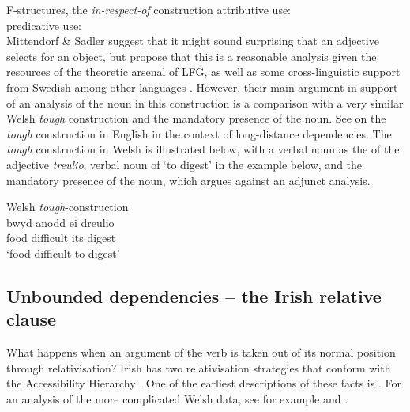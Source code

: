 \documentclass[output=paper,colorlinks,citecolor=brown]{langscibook}
\begin{document}
\ea\label{ex:Celtic:23} F-structures, the \emph{in-respect-of} construction \citep[12]{MittSadl08}
\ea attributive use:\\[1ex]
{}
\ex predicative use:\\[1ex]
{}
\z\z
Mittendorf \& Sadler suggest that it might sound surprising that an adjective selects for an object, but propose that this is a reasonable analysis given the resources of the theoretic arsenal of LFG, as well as some cross-linguistic support from Swedish among other languages \citep[18]{MittSadl08}. However, their main argument in support of an \OBJ analysis of the noun in this construction is a comparison with a very similar Welsh \emph{tough} construction and the mandatory presence of the noun.  See  on the \emph{tough} construction in English in the context of long-distance dependencies.  The \emph{tough} construction in Welsh is illustrated below, with a verbal noun as the \COMP of the adjective \emph{treulio}, verbal noun of `to digest' in the example below, and the mandatory presence of the noun, which argues against an adjunct analysis.

\ea\label{ex:Celtic:24} Welsh \emph{tough}-construction \citep[14]{MittSadl08}\\
\gll bwyd anodd ei dreulio\\
food difficult its digest\\
\glt`food difficult to digest'
\z

\subsection{Unbounded dependencies -- the Irish relative clause}
\label{sec:Celtic:3.4}

What happens when an argument of the verb is taken out of its normal position through relativisation? Irish has two relativisation strategies that conform with the Accessibility Hierarchy \citep{keenan1977noun}. One of the earliest descriptions of these facts is \citet{McCloskey79}. For an analysis of the more complicated Welsh data, see for example \citet{Tallerman1990} and \citet{Borsley2013}.
\end{document}
